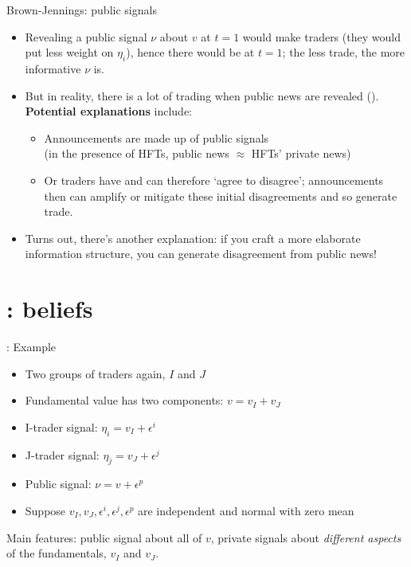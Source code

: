 \documentclass[english,10pt
,aspectratio=169
]{beamer}
\begin{document}
\begin{frame}{Brown-Jennings: public signals}
	\begin{itemize}
		\item Revealing a \alert{public signal $\nu$} about $v$ at $t=1$ would make traders  (they would put less weight on $\eta_i$), hence there would be  at $t=1$; the less trade, the more informative $\nu$ is.
		\item But in reality, there is a lot of trading when public news are revealed (\citet*{bailey_economic_2006}). \textbf{Potential explanations} include:
		\begin{itemize}
			\item Announcements are made up of public  signals \\
			(in the presence of HFTs, public news $\approx$ HFTs' private news)
			\item Or traders have  and can therefore `agree to disagree'; announcements then can amplify or mitigate these initial disagreements and so generate trade.
		\end{itemize}
		\item Turns out, there's another explanation: if you craft a more elaborate information structure, you can generate disagreement from public news!
	\end{itemize}
\end{frame}



\section{\cite{kondor_more_2012}: beliefs}

\begin{frame}{\cite{kondor_more_2012}: Example}
	\begin{itemize}
		\item Two groups of traders again, $I$ and $J$
		\item Fundamental value has two components: $v=v_{I}+v_{J}$
		\item I-trader signal: $\eta_i = v_{I}+\epsilon^{i}$
		\item J-trader signal: $\eta_j = v_{J}+\epsilon^{j}$
		\item Public signal: $\nu = v + \epsilon^{p}$
		\item Suppose $v_{I},v_{J}, \epsilon^{i}, \epsilon^{j}, \epsilon^{p}$ are independent and normal with zero mean
	\end{itemize}
	Main features: public signal about all of $v$, private signals about \emph{different aspects} of the fundamentals, $v_I$ and $v_J$.
\end{frame}
\end{document}
